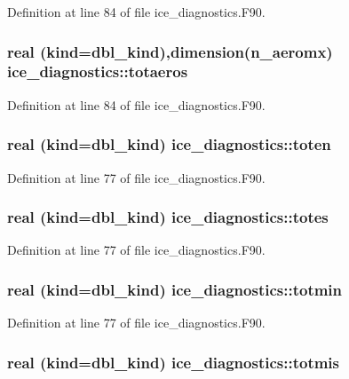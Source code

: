 Definition at line 84 of file ice\_\-diagnostics.F90.\hypertarget{namespaceice__diagnostics_a0fbcc49b04eb0b1f8ec682886abec653}{
\subsubsection[{totaeros}]{\setlength{\rightskip}{0pt plus 5cm}real (kind=dbl\_\-kind),dimension(n\_\-aeromx) {\bf ice\_\-diagnostics::totaeros}}}
\label{namespaceice__diagnostics_a0fbcc49b04eb0b1f8ec682886abec653}


Definition at line 84 of file ice\_\-diagnostics.F90.\hypertarget{namespaceice__diagnostics_a2ca0dd7abee30b5f5efc72fc53a8e1a2}{
\subsubsection[{toten}]{\setlength{\rightskip}{0pt plus 5cm}real (kind=dbl\_\-kind) {\bf ice\_\-diagnostics::toten}}}
\label{namespaceice__diagnostics_a2ca0dd7abee30b5f5efc72fc53a8e1a2}


Definition at line 77 of file ice\_\-diagnostics.F90.\hypertarget{namespaceice__diagnostics_ae008664e2d6b21a926cf781260b3c251}{
\subsubsection[{totes}]{\setlength{\rightskip}{0pt plus 5cm}real (kind=dbl\_\-kind) {\bf ice\_\-diagnostics::totes}}}
\label{namespaceice__diagnostics_ae008664e2d6b21a926cf781260b3c251}


Definition at line 77 of file ice\_\-diagnostics.F90.\hypertarget{namespaceice__diagnostics_a810e9254a399aaee3f3bc9f45fda5616}{
\subsubsection[{totmin}]{\setlength{\rightskip}{0pt plus 5cm}real (kind=dbl\_\-kind) {\bf ice\_\-diagnostics::totmin}}}
\label{namespaceice__diagnostics_a810e9254a399aaee3f3bc9f45fda5616}


Definition at line 77 of file ice\_\-diagnostics.F90.\hypertarget{namespaceice__diagnostics_a34eaaab8fe90658931ee055c55fa4ef6}{
\subsubsection[{totmis}]{\setlength{\rightskip}{0pt plus 5cm}real (kind=dbl\_\-kind) {\bf ice\_\-diagnostics::totmis}}}
\label{namespaceice__diagnostics_a34eaaab8fe90658931ee055c55fa4ef6}


